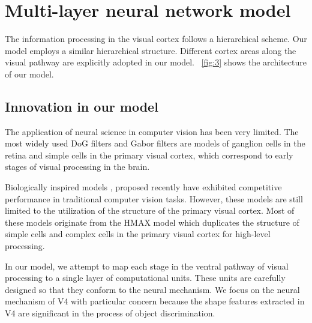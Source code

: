 \documentclass[10pt]{article}
\begin{document}
\section{Multi-layer neural network model}\label{sec:3}

The information processing in the visual cortex follows a hierarchical scheme.
Our model employs a similar hierarchical structure.
Different cortex areas along the visual pathway are explicitly adopted in our model. 
\figurename~\ref{fig:3} shows the architecture of our model.

\subsection{Innovation in our model}

The application of neural science in computer vision has been very limited.
The most widely used DoG filters and Gabor filters 
are models of ganglion cells in the retina and simple cells in the primary visual cortex, 
which correspond to early stages of visual processing in the brain.

Biologically inspired models \cite{serre2007, hong2011},
proposed recently have exhibited competitive performance in traditional computer vision tasks.
However, these models are still limited to the utilization 
of the structure of the primary visual cortex. 
Most of these models originate from the HMAX \cite{riesenhuber1999} model 
which duplicates the structure of simple cells and complex cells
in the primary visual cortex for high-level processing.

In our model, we attempt to map each stage in the ventral pathway of visual processing
to a single layer of computational units.
These units are carefully designed so that they conform to the neural mechanism.
We focus on the neural mechanism of V4 with particular concern
because the shape features extracted in V4 are significant in the process of object discrimination.
\end{document}
